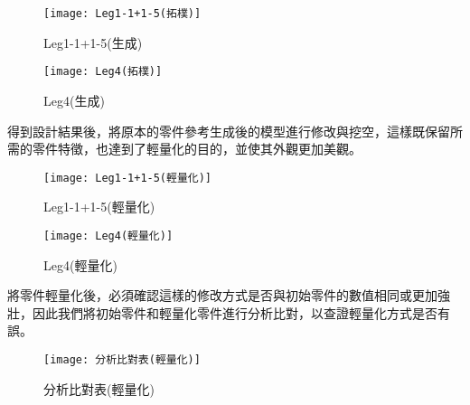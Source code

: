 \begin{figure}[htbp]
  \centering
  \begin{minipage}{0.45\textwidth}
    \centering
    \texttt{[image: Leg1-1+1-5(拓樸)]}
    \caption{Leg1-1+1-5(生成)}
    \label{Leg1-1+1-5(拓樸)}
  \end{minipage}
  \hfill
  \begin{minipage}{0.45\textwidth}
    \centering
    \texttt{[image: Leg4(拓樸)]}
    \caption{Leg4(生成)}
    \label{Leg4(拓樸)}
  \end{minipage}
  \end{figure}

得到設計結果後，將原本的零件參考生成後的模型進行修改與挖空，這樣既保留所需的零件特徵，也達到了輕量化的目的，並使其外觀更加美觀。\\

\begin{figure}[htbp]
  \centering
  \begin{minipage}{0.45\textwidth}
    \centering
    \texttt{[image: Leg1-1+1-5(輕量化)]}
    \caption{Leg1-1+1-5(輕量化)}
    \label{Leg1-1+1-5(輕量化)}
  \end{minipage}
  \hfill
  \begin{minipage}{0.45\textwidth}
    \centering
    \texttt{[image: Leg4(輕量化)]}
    \caption{Leg4(輕量化)}
    \label{Leg4(輕量化)}
  \end{minipage}
  \end{figure}

將零件輕量化後，必須確認這樣的修改方式是否與初始零件的數值相同或更加強壯，因此我們將初始零件和輕量化零件進行分析比對，以查證輕量化方式是否有誤。\\

\begin{figure}[hbt!]
\center
\texttt{[image: 分析比對表(輕量化)]}
\caption{\Large 分析比對表(輕量化)}
\label{分析比對表(輕量化)}
\end{figure}

\begin{table}[htb!]
  \center\large
  \caption{\Large leg1-1+1-5分析比對}
\end{table}

\begin{table}[htb!]
  \center\large
  \caption{\Large leg4分析比對}
\end{table}

